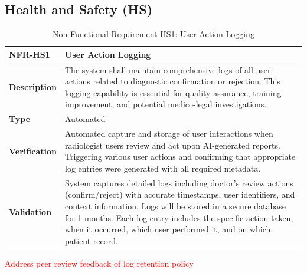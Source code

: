 \documentclass[12pt, titlepage]{article}
\begin{document}
\subsection{Health and Safety (HS)}
\begin{table}[h!]
\centering
{}
\begin{tabular}{|p{3.5cm}|p{11.5cm}|}
\hline
\rowcolor{gray!30}
\textbf{NFR-HS1} & \textbf{User Action Logging} \\
\hline
\textbf{Description} & The system shall maintain comprehensive logs of all user actions related to diagnostic confirmation or rejection. This logging capability is essential for quality assurance, training improvement, and potential medico-legal investigations. \\
\hline
\textbf{Type} & Automated \\
\hline
\textbf{Verification} & Automated capture and storage of user interactions when radiologist users review and act upon AI-generated reports. Triggering various user actions and confirming that appropriate log entries were generated with all required metadata. \\
\hline
\textbf{Validation} & System captures detailed logs including doctor's review actions (confirm/reject) with accurate timestamps, user identifiers, and context information. Logs will be stored in a secure database for 1 months. Each log entry includes the specific action taken, when it occurred, which user performed it, and on which patient record. \\
\hline
\end{tabular}
\caption{Non-Functional Requirement HS1: User Action Logging}
\textcolor{red}{Address peer review feedback of log retention policy}
\end{table}
\end{document}
